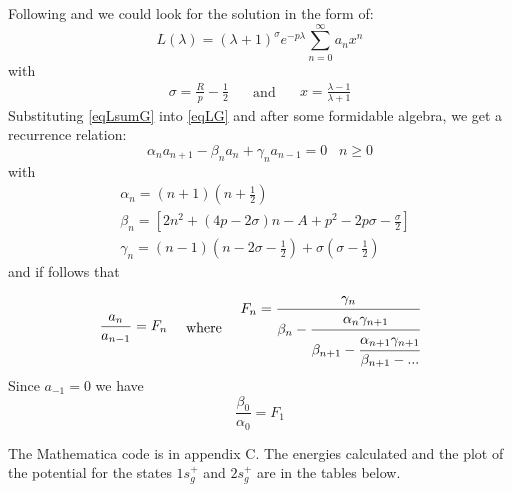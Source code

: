 Following \cite{Bates1} and \cite{H2Plus2d2} we could look for the solution in the form of:
\begin{equation}\label{eqLsumG}
L(\lambda) = \left(\lambda +1\right)^\sigma e^{-p\lambda}\sum_{n=0}^{\infty}{a_nx^n}
\end{equation}
with
\begin{equation}
\begin{split}
\sigma = \frac{R}{p} - \frac{1}{2}
\end{split}
\quad\text{ and }\quad
\begin{split}
x = \frac{\lambda-1}{\lambda+1}
\end{split}
\end{equation}
Substituting \eqref{eqLsumG} into \eqref{eqLG} and after some formidable algebra, we get a recurrence relation:
\begin{equation}
\alpha_na_{n+1}-\beta_n a_n+\gamma_na_{n-1} = 0\,\,\,\,\,n \ge 0
\end{equation}
with
\begin{equation}
\begin{split}
& \alpha_n = \left(n + 1\right)\left(n + \frac{1}{2}\right)\\[.8em]
& \beta_n = \left[2n^2 + (4p - 2\sigma)n - A + p^2 - 2p\sigma - \frac{\sigma}{2}\right] \\[.8em]
& \gamma_n = (n-1)\left(n - 2\sigma - \frac{1}{2}\right) + \sigma\left(\sigma - \frac{1}{2}\right)
\end{split}
\end{equation}
and if follows that
\begin{equation}
\begin{split}
\frac{a_n}{a_{n-1}} = F_n
\end{split}
\quad\text{ where }\quad
\begin{split}
F_n = \cfrac{\gamma_n}{\beta_n - \cfrac{\alpha_n \gamma_{n+1}}{\beta_{n+1}-\cfrac{\alpha_{n+1}\gamma_{n+1}}{\beta_{n+1}-\text{...}}}}
\end{split}
\end{equation}
Since $ a_{-1} = 0$ we have
\begin{equation}
\frac{\beta_0}{\alpha_0} = F_1
\end{equation}

The Mathematica code is in appendix C. The energies calculated and the plot of the potential for the states $1s_g^{+}$ and $ 2s_g^{+} $ are in the tables below.

